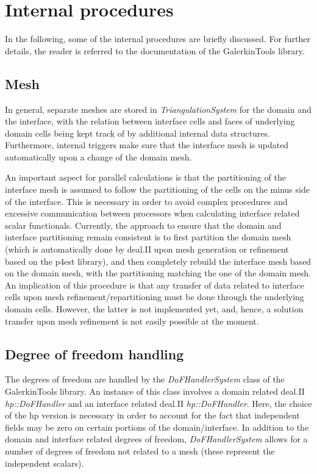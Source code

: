\documentclass[pdftex,a4paper,12pt,abstracton]{scrartcl}
\begin{document}
\section{Internal procedures}
In the following, some of the internal procedures are briefly discussed. For further details, the reader is referred to the documentation of the GalerkinTools library.

\subsection{Mesh}
In general, separate meshes are stored in \textit{TriangulationSystem} for the domain and the interface, with the relation between interface cells and faces of underlying domain cells being kept track of by additional internal data structures. Furthermore, internal triggers make sure that the interface mesh is updated automatically upon a change of the domain mesh.

An important aspect for parallel calculations is that the partitioning of the interface mesh is assumed to follow the partitioning of the cells on the minus side of the interface. This is necessary in order to avoid complex procedures and excessive communication between processors when calculating interface related scalar functionals. Currently, the approach to ensure that the domain and interface partitioning remain consistent is to first partition the domain mesh (which is automatically done by deal.II upon mesh generation or refinement based on the p4est library), and then completely rebuild the interface mesh based on the domain mesh, with the partitioning matching the one of the domain mesh. An implication of this procedure is that any transfer of data related to interface cells upon mesh refinement/repartitioning must be done through the underlying domain cells. However, the latter is not implemented yet, and, hence, a solution transfer upon mesh refinement is not easily possible at the moment.

\subsection{Degree of freedom handling}
The degrees of freedom are handled by the \textit{DoFHandlerSystem} class of the GalerkinTools library. An instance of this class involves a domain related deal.II \textit{hp::DoFHandler} and an interface related deal.II \textit{hp::DoFHandler}. Here, the choice of the hp version is necessary in order to account for the fact that independent fields may be zero on certain portions of the domain/interface. In addition to the domain and interface related degrees of freedom, \textit{DoFHandlerSystem} allows for a number of degrees of freedom not related to a mesh (these represent the independent scalars).
\end{document}

